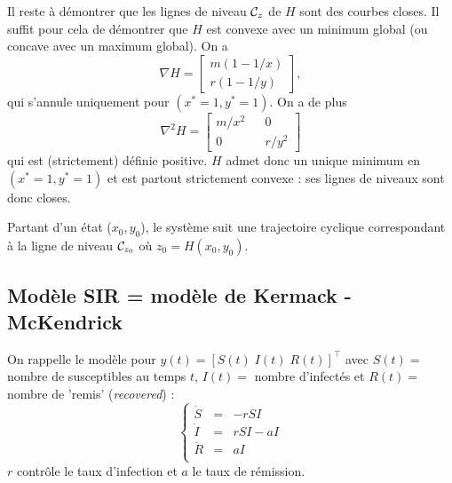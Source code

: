 \bigskip
Il reste à démontrer que les lignes de niveau $\mathcal{C}_z$ de $H$ sont des courbes closes. Il suffit pour cela de démontrer que $H$ est convexe avec un minimum global (ou concave avec un maximum global). On a
$$
\nabla H = \left[\begin{array}{c} m(1 - 1/x) \\ r(1 - 1/y)\end{array}\right], 
$$
qui s'annule uniquement pour $(x^* = 1, y^*=1)$. On a de plus
$$
\nabla^2 H = \left[\begin{array}{ccc} m/x^2 & & 0 \\ 0 & & r/y^2 \end{array}\right] 
$$
qui est (strictement) définie positive.
$H$ admet donc un unique minimum en $(x^* = 1, y^*=1)$ et est partout strictement convexe : ses lignes de niveaux sont donc closes.

\bigskip
Partant d'un état ($x_0, y_0$), le système suit une trajectoire cyclique 
correspondant à la ligne de niveau $\mathcal{C}_{z_0}$ où $z_0 = H(x_0, y_0)$.


\subsection{Modèle SIR = modèle de Kermack - McKendrick}

On rappelle le modèle pour $y(t) = [S(t) \; I(t) \; R(t)]^\top$ avec $S(t) =$ nombre de susceptibles au temps $t$, $I(t) =$ nombre d'infectés et $R(t) =$ nombre de 'remis' ({\em recovered}) :
$$
\left\{ \begin{array}{rcl} 
\dot S & = & - r S I \\
\dot I & = & r S I - a I \\
\dot R & = & a I \\
\end{array} \right.
$$
$r$ contrôle le taux d'infection et $a$ le taux de rémission.


